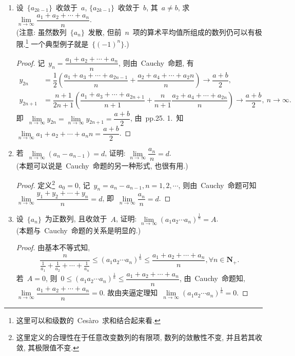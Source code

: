 \documentclass[UTF8,a4paper,11pt,twoside]{book}
\begin{document}
\begin{enumerate}
\begin{proof}
	      \end{proof}
	\item 设~$\{a_{2k-1}\}$~收敛于~$a$, $\{a_{2k-1}\}$~收敛于~$b$, 其~$a\neq b$, 求~$\lim\limits_{n\to\infty} \dfrac{a_1+a_2+\cdots+a_n}{n}$.\\
	      (注意: 虽然数列~$\{a_n\}$~发散, 但前~$n$~项的算术平均值所组成的数列仍可以有极限.\footnote{这里可以和级数的~Ces\`aro~求和结合起来看.} 一个典型例子就是~$\{(-1)^n\}$.)
	      \begin{proof}
		      记~$y_n=\dfrac{a_1+a_2+\cdots+a_n}{n}$, 则由~Cauchy~命题, 有
		      \begin{equation*}
			      \begin{split}
				      y_{2n}&=\dfrac{1}{2}\left(\dfrac{a_1+a_3+\cdots+a_{2n-1}}{n}+\dfrac{a_2+a_4+\cdots+a_2n}{n}\right)\to\dfrac{a+b}{2},\\
				      y_{2n+1}&=\dfrac{n+1}{2n+1}\left(\dfrac{a_1+a_3+\cdots+a_{2n+1}}{n+1}+\dfrac{n}{n+1}\dfrac{a_2+a_4+\cdots+a_{2n}}{n}\right)\to\dfrac{a+b}{2},\ n\to\infty.
			      \end{split}
		      \end{equation*}
		      即~$\lim\limits_{n\to\infty} y_{2n}=\lim\limits_{n\to\infty} y_{2n+1}=\dfrac{a+b}{2}$, 由~pp.25. 1.~知~$\lim\limits_{n\to\infty} {a_1+a_2+\cdots+a_n}{n}=\dfrac{a+b}{2}$.\qedhere
	      \end{proof}
	\item 若~$\lim\limits_{n\to\infty} (a_n-a_{n-1})=d$, 证明: $\lim\limits_{n\to\infty} \dfrac{a_n}{n}=d$.\\
	      (本题可以说是~Cauchy~命题的另一种形式, 也很有用.)
	      \begin{proof}
		      定义\footnote{这里定义的合理性在于任意改变数列的有限项, 数列的敛散性不变, 并且若其收敛, 其极限值不变.}~$a_0=0$, 记~$y_n=a_n-a_{n-1}, n=1,2,\cdots$, 则由~Cauchy~命题可知~$\lim\limits_{n\to\infty} \dfrac{y_1+y_2+\cdots+y_n}{n}=d$, 即~$\lim\limits_{n\to\infty} \dfrac{a_n}{n}=d$.\qedhere
	      \end{proof}
	\item 设~$\{a_n\}$~为正数列, 且收敛于~$A$, 证明: $\lim\limits_{n\to\infty} (a_1a_2\cdots a_n)^\frac{1}{n}=A$.\\
	      (本题与~Cauchy~命题的关系是明显的.)
	      \begin{proof}
		      由基本不等式知,
		      \[
			      \dfrac{n}{\frac{1}{a_1}+\frac{1}{a_2}+\cdots+\frac{1}{a_n}}\leqslant(a_1a_2\cdots a_n)^{\frac{1}{n}}\leqslant\dfrac{a_1+a_2+\cdots+a_n}{n}, \forall n\in\mathbf{N}_{+}.
		      \]
		      若~$A=0$, 则~$0\leqslant(a_1a_2\cdots a_n)^{\frac{1}{n}}\leqslant\dfrac{a_1+a_2+\cdots+a_n}{n}$, 由~Cauchy~命题知, $\lim\limits_{n\to\infty} \dfrac{a_1+a_2+\cdots+a_n}{n}=0$. 故由夹逼定理知~$\lim\limits_{n\to\infty} (a_1a_2\cdots a_n)^\frac{1}{n}=0$.


\end{proof}
\end{enumerate}
\end{document}
